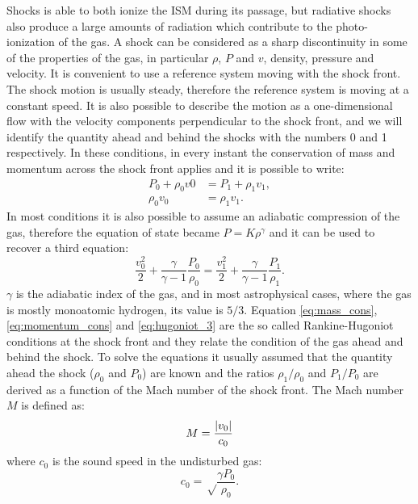 \documentclass[../main.tex]{subfiles}
\begin{document}
Shocks is able to both ionize the ISM during its passage, but radiative shocks also produce a large amounts of radiation which contribute to the photo-ionization of the gas.
A shock can be considered as a sharp discontinuity in some of the properties of the gas, in particular $\rho$, $P$ and $v$, density, pressure and velocity.
It is convenient to use a reference system moving with the shock front.
The shock motion is usually steady, therefore the reference system is moving at a constant speed.
It is also possible to describe the motion as a one-dimensional flow with the velocity components perpendicular to the shock front, and we will identify the quantity ahead and behind the shocks with the numbers 0 and 1 respectively.
In these conditions, in every instant the conservation of mass and momentum across the shock front applies and it is possible to write:
\begin{align}
    \label{eq:mass_cons}
    P_0 + \rho_0 v0 &= P_1+\rho_1 v_1,\\
    \label{eq:momentum_cons}
    \rho_0 v_0 &= \rho_1 v_1.
\end{align}
In most conditions it is also possible to assume an adiabatic compression of the gas, therefore the equation of state became $P = K \rho^{\gamma}$ and it can be used to recover a third equation:
\begin{equation}
    \label{eq:hugoniot_3}
    \frac{v^2_0}{2} + \frac{\gamma}{\gamma-1}\frac{P_0}{\rho_0} = \frac{v^2_1}{2} + \frac{\gamma}{\gamma-1}\frac{P_1}{\rho_1}.
\end{equation}
$\gamma$ is the adiabatic index of the gas, and in most astrophysical cases, where the gas is mostly monoatomic hydrogen, its value is $5/3$.
Equation \ref{eq:mass_cons}, \ref{eq:momentum_cons} and \ref{eq:hugoniot_3} are the so called Rankine-Hugoniot conditions at the shock front and they relate the condition of the gas ahead and behind the shock.
To solve the equations it usually assumed that the quantity ahead the shock ($\rho_0$ and $P_0$) are known and the ratios $\rho_1/\rho_0$ and $P_1/P_0$ are derived as a function of the Mach number of the shock front.
The Mach number $M$ is defined as:
\begin{equation}
    \label{eq:mach}
    M = \frac{\lvert v_0\rvert}{c_0}
\end{equation}
where $c_0$ is the sound speed in the undisturbed gas:
\begin{equation}
    \label{eq:soundspeed}
    c_0 = \sqrt\frac{\gamma P_0}{\rho_0}.
\end{equation}
\end{document}
